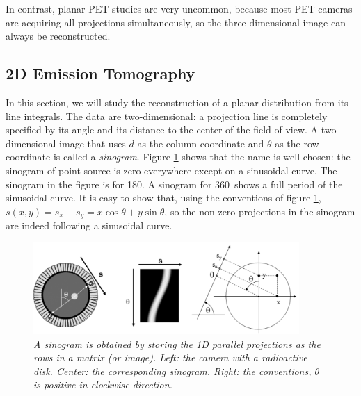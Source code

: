 \documentclass[11pt,oneside]{article}
\begin{document}
In contrast, planar PET studies are very uncommon, because most PET-cameras
are acquiring all projections simultaneously, so the three-dimensional image
can always be reconstructed.

\subsection{2D Emission Tomography}

In this section, we will study the reconstruction of a planar distribution
from its line integrals. The data are two-dimensional: a projection line is
completely specified by its angle and its distance to the center of the field
of view. A two-dimensional image that uses $d$ as the column coordinate and
$\theta$ as the row coordinate is called a {\em sinogram}. Figure
\ref{fig:sinogram} shows that the name is well chosen: the sinogram of point
source is zero everywhere except on a sinusoidal curve. The sinogram in the
figure is for 180\textdegree. A sinogram for 360\textdegree\ shows a full period of
the sinusoidal curve. It is easy to show that, using the conventions of figure
\ref{fig:sinogram}, $s(x,y) = s_x + s_y = x \cos \theta + y \sin \theta$, so
the non-zero projections in the sinogram are indeed following a sinusoidal
curve.

\begin{figure}[tb]
\centering
\includegraphics[width=0.9\textwidth]{figs/fig_sinogram.pdf}
\caption{\label{fig:sinogram} \emph{A sinogram is obtained by storing the 1D
parallel projections as the rows in a matrix (or image). Left: the camera with
a radioactive disk. Center: the corresponding sinogram. Right: the
conventions, $\theta$ is positive in clockwise direction.}}
\end{figure}
\end{document}
